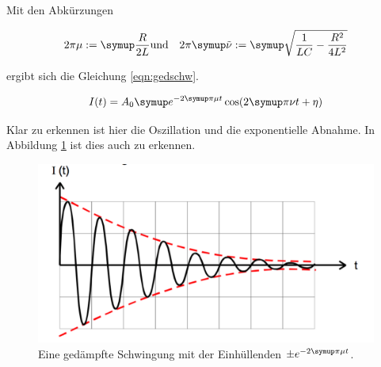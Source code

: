 Mit den Abkürzungen

\begin{align}
  2 \pi \mu := \g{\frac{R}{2 L}} & \text{und} & 2 \pi \g{\tilde{\nu}} := \g{\sqrt{\frac{1}{L C} - \frac{R^2}{4 L^2}}}
\end{align}

ergibt sich die Gleichung \eqref{eqn:gedschw}.

\begin{equation}
  I(t) = A_0 \g{e}^{-2 \g{\pi} \mu t} \cos(2 \g{\pi} \nu t + \eta)
  \label{eqn:gedschw}
\end{equation}

Klar zu erkennen ist hier die Oszillation und die exponentielle Abnahme.
In Abbildung \ref{fig:gedschw} ist dies auch zu erkennen.

\begin{figure}[h]
  \centering
  \includegraphics[width = \textwidth]{gedschw.pdf}
  \caption{Eine gedämpfte Schwingung mit der Einhüllenden $\pm e^{-2\g{\pi}\mu t}$.}
  \label{fig:gedschw}
\end{figure}
